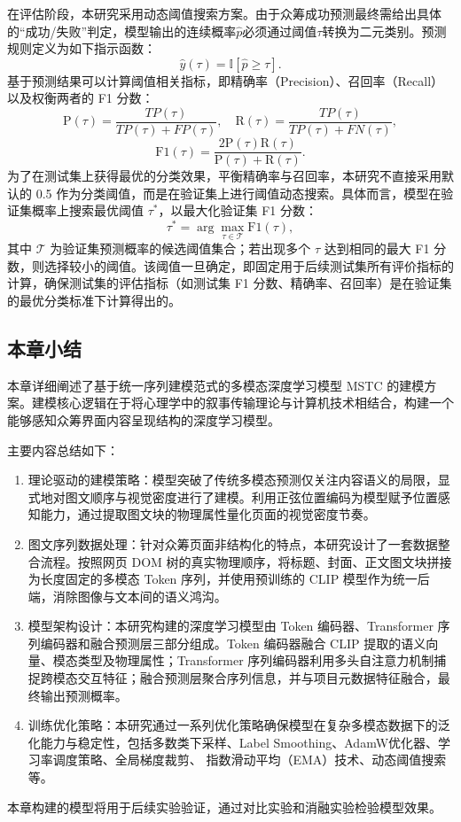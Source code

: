 在评估阶段，本研究采用动态阈值搜索方案。由于众筹成功预测最终需给出具体的“成功/失败”判定，模型输出的连续概率$ \hat p $必须通过阈值$ \tau $转换为二元类别。预测规则定义为如下指示函数：
\begin{equation}
\hat{y}(\tau)=\mathbb{I}[\hat{p}\ge \tau].
\end{equation}
基于预测结果可以计算阈值相关指标，即精确率（Precision）、召回率（Recall）以及权衡两者的 F1 分数：
\begin{equation}
\text{P}(\tau)=\frac{TP(\tau)}{TP(\tau)+FP(\tau)},\quad
\text{R}(\tau)=\frac{TP(\tau)}{TP(\tau)+FN(\tau)},
\end{equation}
\begin{equation}
\text{F1}(\tau)=\frac{2\text{P}(\tau)\text{R}(\tau)}{\text{P}(\tau)+\text{R}(\tau)}.
\end{equation}
为了在测试集上获得最优的分类效果，平衡精确率与召回率，本研究不直接采用默认的 0.5 作为分类阈值，而是在验证集上进行阈值动态搜索。具体而言，模型在验证集概率上搜索最优阈值 $ \tau ^* $，以最大化验证集 F1 分数：
\begin{equation}
\tau^*=\arg\max_{\tau\in\mathcal{T}}\text{F1}(\tau),
\end{equation}
其中 $ \mathcal{T} $ 为验证集预测概率的候选阈值集合；若出现多个 $ \tau $ 达到相同的最大 F1 分数，则选择较小的阈值。该阈值一旦确定，即固定用于后续测试集所有评价指标的计算，确保测试集的评估指标（如测试集 F1 分数、精确率、召回率）是在验证集的最优分类标准下计算得出的。

\subsection{本章小结}
本章详细阐述了基于统一序列建模范式的多模态深度学习模型 MSTC 的建模方案。建模核心逻辑在于将心理学中的叙事传输理论与计算机技术相结合，构建一个能够感知众筹界面内容呈现结构的深度学习模型。

主要内容总结如下：

\begin{enumerate}[label=(\arabic*)]
  \item 理论驱动的建模策略：模型突破了传统多模态预测仅关注内容语义的局限，显式地对图文顺序与视觉密度进行了建模。利用正弦位置编码为模型赋予位置感知能力，通过提取图文块的物理属性量化页面的视觉密度节奏。
  \item 图文序列数据处理：针对众筹页面非结构化的特点，本研究设计了一套数据整合流程。按照网页 DOM 树的真实物理顺序，将标题、封面、正文图文块拼接为长度固定的多模态 Token 序列，并使用预训练的 CLIP 模型作为统一后端，消除图像与文本间的语义鸿沟。
  \item 模型架构设计：本研究构建的深度学习模型由 Token 编码器、Transformer 序列编码器和融合预测层三部分组成。Token 编码器融合 CLIP 提取的语义向量、模态类型及物理属性；Transformer 序列编码器利用多头自注意力机制捕捉跨模态交互特征；融合预测层聚合序列信息，并与项目元数据特征融合，最终输出预测概率。
  \item 训练优化策略：本研究通过一系列优化策略确保模型在复杂多模态数据下的泛化能力与稳定性，包括多数类下采样、Label Smoothing、AdamW优化器、学习率调度策略、全局梯度裁剪、 指数滑动平均（EMA）技术、动态阈值搜索等。
\end{enumerate}

本章构建的模型将用于后续实验验证，通过对比实验和消融实验检验模型效果。
